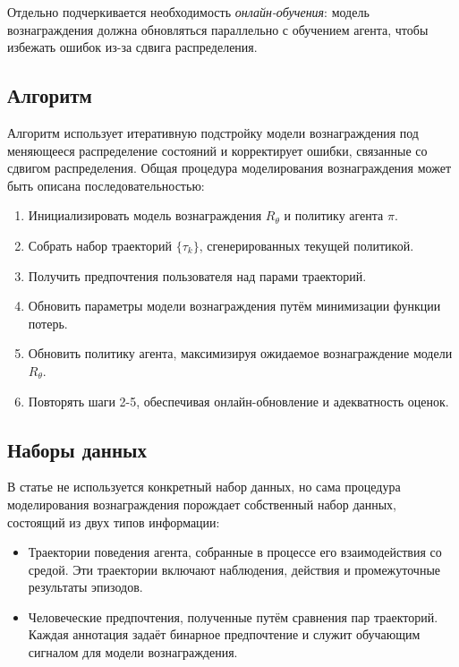 Отдельно подчеркивается необходимость \emph{онлайн-обучения}: модель 
вознаграждения должна обновляться параллельно с обучением агента, чтобы 
избежать ошибок из-за сдвига распределения.

\subsection{Алгоритм}

Алгоритм использует итеративную подстройку модели вознаграждения под меняющееся 
распределение состояний и корректирует ошибки, связанные со сдвигом распределения.
Общая процедура моделирования вознаграждения может быть описана последовательностью:

\begin{enumerate}
\item Инициализировать модель вознаграждения $R_\theta$ и политику агента $\pi$.
\item Собрать набор траекторий $\{\tau_k\}$, сгенерированных текущей политикой.
\item Получить предпочтения пользователя над парами траекторий.
\item Обновить параметры модели вознаграждения путём минимизации функции потерь.
\item Обновить политику агента, максимизируя ожидаемое вознаграждение модели $R_\theta$.
\item Повторять шаги 2-5, обеспечивая онлайн-обновление и адекватность оценок.
\end{enumerate}

\subsection{Наборы данных}

В статье не используется конкретный набор данных, но сама процедура моделирования
вознаграждения порождает собственный набор данных, состоящий из двух типов информации:

\begin{itemize}
\item Траектории поведения агента, собранные в процессе его взаимодействия со средой. 
Эти траектории включают наблюдения, действия и промежуточные результаты эпизодов.
\item Человеческие предпочтения, полученные путём сравнения пар траекторий. 
Каждая аннотация задаёт бинарное предпочтение и служит обучающим сигналом для модели вознаграждения.
\end{itemize}

